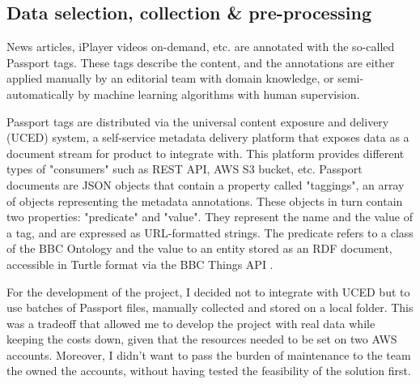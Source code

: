 
\subsection{Data selection, collection \& pre-processing}

News articles, iPlayer videos on-demand, etc. are annotated with the so-called Passport tags.
These tags describe the content, and the annotations are either applied manually
by an editorial team with domain knowledge, or semi-automatically by machine learning algorithms with human supervision.

Passport tags are distributed via the universal content exposure and delivery (UCED) system,
a self-service metadata delivery platform that exposes data as a document stream for product to integrate with.
This platform provides different types of "consumers" such as REST API, AWS S3 bucket, etc.
Passport documents are JSON objects that contain a property called "taggings", an array of objects representing the
metadata annotations. These objects in turn contain two properties: "predicate" and "value". They represent the name and the value of
a tag, and are expressed as URL-formatted strings. The predicate refers to a class of the BBC Ontology \cite{BBC:Ontologies}
and the value to an entity stored as an RDF document, accessible in Turtle format \cite{W3C:Turtle} via the BBC Things API \cite{BBC:Things,BBC:Things:About,BBC:Things:API}.

For the development of the project, I decided not to integrate with UCED but to use batches of Passport files, manually collected and stored
on a local folder.
This was a tradeoff that allowed me to develop the project with real data while keeping the costs down, given that the resources needed to
be set on two AWS accounts. Moreover, I didn't want to pass the burden of maintenance to the team the owned the accounts, without having tested
the feasibility of the solution first.


